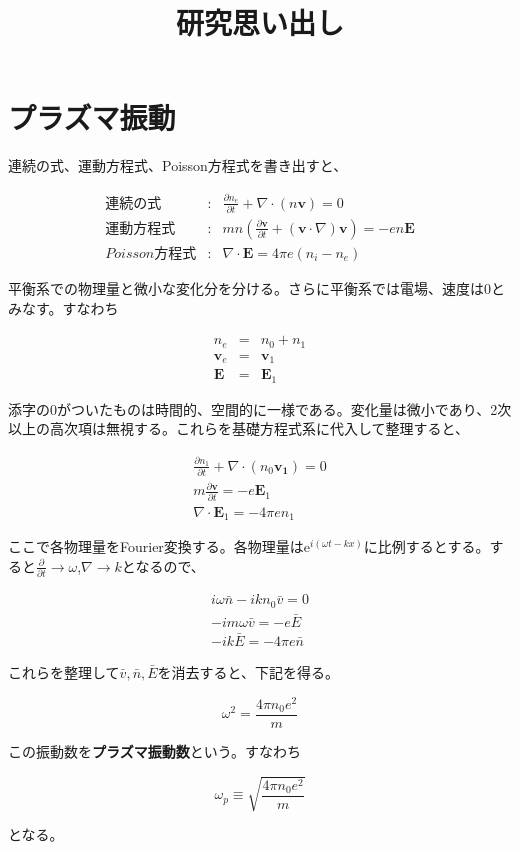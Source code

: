 \documentclass[18pt]{jsarticle}
\title{研究思い出し}
\begin{document}
\section{プラズマ振動}
\par 連続の式、運動方程式、Poisson方程式を書き出すと、

\begin{eqnarray}
    \label{continuous} 連続の式 &:& \frac{\partial n_e}{\partial t} +
        \nabla\cdot (n\bm{v}) = 0 \\
    \label{motion} 運動方程式 &:& mn\left( \frac{\partial \bm{v}}{\partial t}+
      (\bm{v}\cdot\nabla)\bm{v}\right) = -en\bm{E} \\
    \label{poisson} Poisson方程式 &:& \nabla\cdot\bm{E}=4\pi e(n_i-n_e)
\end{eqnarray}

\par 平衡系での物理量と微小な変化分を分ける。さらに平衡系では電場、速度は0とみなす。すなわち

\begin{eqnarray}
    n_e &=& n_0 + n_1 \nonumber \\ 
    \bm{v}_e &=& \bm{v}_1 \nonumber \\
    \bm{E} &=& \bm{E}_1 \nonumber 
\end{eqnarray}

添字の0がついたものは時間的、空間的に一様である。変化量は微小であり、2次以上の高次項は無視する。これらを基礎方程式系に代入して整理すると、

\begin{eqnarray}
    \frac{\partial n_1}{\partial t}+\nabla\cdot(n_0\bm{v_1}) = 0 \\
    m\frac{\partial \bm{v}}{\partial t} = -e\bm{E}_1 \\
    \nabla\cdot\bm{E}_1 = -4\pi en_1
\end{eqnarray}

\par ここで各物理量をFourier変換する。各物理量は$\mathrm{e}^{i(\omega t-kx)}$に比例するとする。すると$\frac{\partial}{\partial t}\rightarrow\omega$,$\nabla\rightarrow k$となるので、

\begin{eqnarray}
    i\omega \bar{n}-ikn_0 \bar{v} = 0 \\
    -im\omega\bar{v} = -e\bar{E} \\
    -ik\bar{E}=-4\pi e\bar{n}
\end{eqnarray}

これらを整理して$\bar{v},\bar{n},\bar{E}$を消去すると、下記を得る。

\begin{equation}
    \omega^2 = \frac{4\pi n_0 e^2}{m}
\end{equation}

この振動数を\textbf{プラズマ振動数}という。すなわち

\begin{equation}
    \omega_p \equiv \sqrt{\frac{4\pi n_0 e^2}{m}}
\end{equation}

となる。
\end{document}
